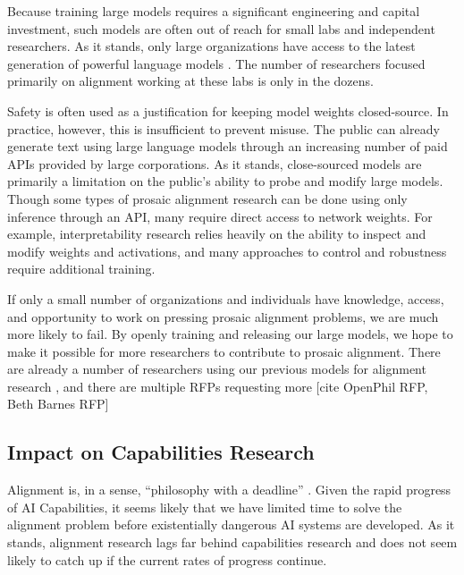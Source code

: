 \documentclass{article}
\begin{document}
Because training large models requires a significant engineering and capital investment, such models are often out of reach for small labs and independent researchers. As it stands, only large organizations have access to the latest generation of powerful language models \citep{brown2020language, gopher, switch-transformer, lieber2021jurassic, WuDao, fairseq-13B}. The number of researchers focused primarily on alignment working at these labs is only in the dozens. 

Safety is often used as a justification for keeping model weights closed-source. In practice, however, this is insufficient to prevent misuse. The public can already generate text using large language models through an increasing number of paid APIs provided by large corporations. As it stands, close-sourced models are primarily a limitation on the public’s ability to probe and modify large models. Though some types of prosaic alignment research can be done using only inference through an API, many require direct access to network weights. For example, interpretability research relies heavily on the ability to inspect and modify weights and activations, and many approaches to control and robustness require additional training. 

If only a small number of organizations and individuals have knowledge, access, and opportunity to work on pressing prosaic alignment problems, we are much more likely to fail. By openly training and releasing our large models, we hope to make it possible for more researchers to contribute to prosaic alignment. There are already a number of researchers using our previous models for alignment research \citep{logit-lens,anonymous2022ROME, lin2021truthfulqa}, and there are multiple RFPs requesting more [cite OpenPhil RFP, Beth Barnes RFP]
\subsection{Impact on Capabilities Research}

Alignment is, in a sense, ``philosophy with a deadline'' \citep{superintelligence}. Given the rapid progress of AI Capabilities, it seems likely that we have limited time to solve the alignment problem before existentially dangerous AI systems are developed. As it stands, alignment research lags far behind capabilities research and does not seem likely to catch up if the current rates of progress continue.
\end{document}
